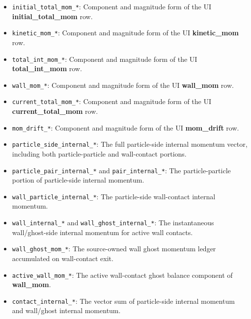 \begin{itemize}
\item \texttt{initial\_total\_mom\_*}: Component and magnitude form of the UI
\textbf{initial\_total\_mom} row.

\item \texttt{kinetic\_mom\_*}: Component and magnitude form of the UI
\textbf{kinetic\_mom} row.

\item \texttt{total\_int\_mom\_*}: Component and magnitude form of the UI
\textbf{total\_int\_mom} row.

\item \texttt{wall\_mom\_*}: Component and magnitude form of the UI
\textbf{wall\_mom} row.

\item \texttt{current\_total\_mom\_*}: Component and magnitude form of the UI
\textbf{current\_total\_mom} row.

\item \texttt{mom\_drift\_*}: Component and magnitude form of the UI
\textbf{mom\_drift} row.

\item \texttt{particle\_side\_internal\_*}: The full particle-side internal
momentum vector, including both particle-particle and wall-contact portions.

\item \texttt{particle\_pair\_internal\_*} and \texttt{pair\_internal\_*}: The
particle-particle portion of particle-side internal momentum.

\item \texttt{wall\_particle\_internal\_*}: The particle-side wall-contact
internal momentum.

\item \texttt{wall\_internal\_*} and
\texttt{wall\_ghost\_internal\_*}: The instantaneous wall/ghost-side internal
momentum for active wall contacts.

\item \texttt{wall\_ghost\_mom\_*}: The source-owned wall ghost momentum
ledger accumulated on wall-contact exit.

\item \texttt{active\_wall\_mom\_*}: The active wall-contact ghost balance
component of \textbf{wall\_mom}.

\item \texttt{contact\_internal\_*}: The vector sum of particle-side internal
momentum and wall/ghost internal momentum.


\end{itemize}
